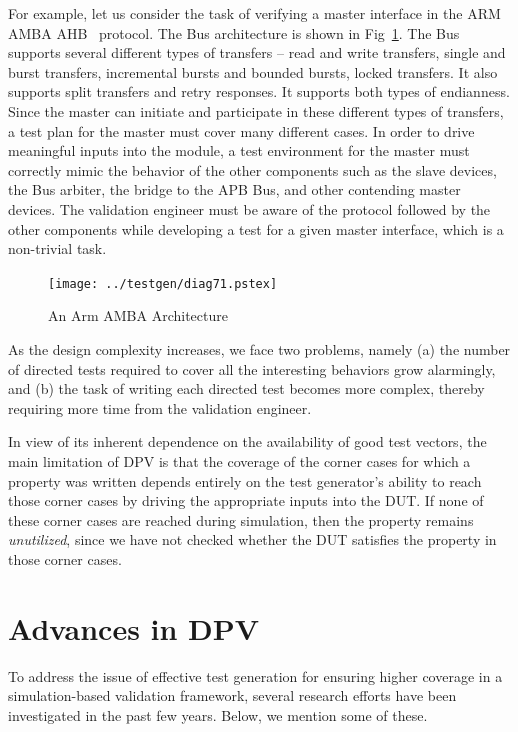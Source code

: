 \noindent
For example, let us consider the task of verifying a master interface in
the ARM AMBA AHB~\cite{ahb} protocol. The Bus architecture is 
shown in Fig~\ref{fig2.12}.
The Bus supports several different types of transfers -- read and write
transfers, single and burst transfers, incremental bursts and bounded bursts,
locked transfers. It also supports split transfers and retry responses. It
supports both types of endianness. Since the master can initiate and
participate in these different types of transfers, a test plan for the master
must cover many different cases. In order to drive meaningful inputs into the
module, a test environment for the master must correctly mimic the behavior
of the other components such as the slave devices, the Bus arbiter, the bridge
to the APB Bus, and other contending master devices. The validation engineer
must be aware of the protocol followed by the other components while
developing a test for a given master interface, which is a non-trivial task.

\begin{figure}[htb] 
\centering
\texttt{[image: ../testgen/diag71.pstex]}
\center
\caption{An Arm AMBA Architecture} \label{fig2.12}
\end{figure}

\noindent
As the design complexity increases, we face two problems, namely (a) the
number of directed tests required to cover all the interesting behaviors
grow alarmingly, and (b) the task of writing each directed test becomes
more complex, thereby requiring more time from the validation engineer. 

\noindent
In view of its inherent dependence on the availability of good test 
vectors, the main limitation of DPV is that the coverage of
the corner cases for which a property was written depends entirely on the test
generator's ability to reach those corner cases by driving the appropriate
inputs into the DUT. If none of these corner cases are reached during
simulation, then the property remains {\em unutilized}, since we have not
checked whether the DUT satisfies the property in those corner cases. 

\section{Advances in DPV}
To address the issue of effective test generation for ensuring higher 
coverage in a simulation-based validation 
framework, several research efforts have been investigated in the 
past few years. Below, we mention some of these.

